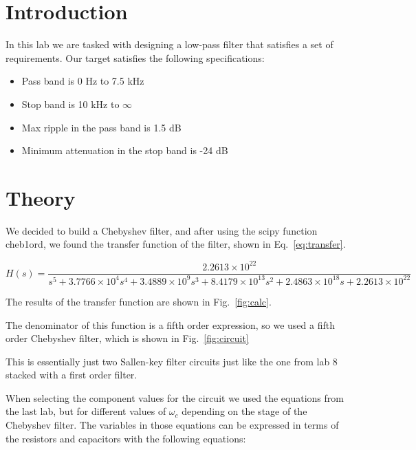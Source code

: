 \documentclass[11pt]{texMemo-gibbons}
\begin{document}
\maketitle

\section{Introduction}
\label{sec:introduction}

In this lab we are tasked with designing a low-pass
filter that satisfies a set of requirements. Our target
satisfies the following specifications:


\begin{itemize}
 \item Pass band is 0 Hz to 7.5 kHz
 \item Stop band is 10 kHz to $\infty$
 \item Max ripple in the pass band is 1.5 dB
 \item Minimum attenuation in the stop band is -24 dB
\end{itemize}


\section{Theory}
\label{sec:theory}

We decided to build a Chebyshev filter, and after using 
the scipy function cheb1ord, we found
the transfer function of the filter, shown in Eq.~\ref{eq:transfer}.

\begin{equation}
  H(s) = \frac{2.2613 \times 10 ^ {22}}{s^5 + 3.7766 \times 10 ^ 4 s ^ 4 + 3.4889 \times 10 ^ 9 s ^ 3 + 8.4179 \times 10 ^ {13} s ^ 2 + 2.4863 \times 10 ^ {18} s + 2.2613 \times 10 ^ {22}}
  \label{eq:transfer}
\end{equation}

The results of the transfer function are shown in Fig.~\ref{fig:calc}.

The denominator of this function is a fifth order expression, so we used
a fifth order Chebyshev filter, which is shown in Fig.~\ref{fig:circuit}

This is essentially just two Sallen-key filter circuits just like
the one from lab 8 stacked with a first order filter.

When selecting the component values for the circuit we used
the equations from the last lab, but for different values of
$\omega_c$ depending on the stage of the Chebyshev filter. The 
variables in those equations can be expressed in terms of
the resistors and capacitors with the following equations:
\end{document}
